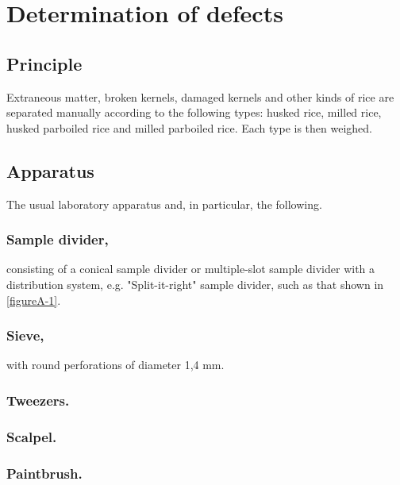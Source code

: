 \section{Determination of defects}
\label{AnnexA}

\subsection{Principle}

Extraneous matter, broken kernels, damaged kernels and other kinds of rice are separated manually according to the following types: husked rice, milled rice, husked parboiled rice and milled parboiled rice. Each type is then weighed.

\subsection{Apparatus}

The usual laboratory apparatus and, in particular, the following.

\subsubsection{Sample divider,}
\label{AnnexA-2-1}

consisting of a conical sample divider or multiple-slot sample divider with a distribution system, e.g. "Split-it-right" sample divider, such as that shown in \ref{figureA-1}.

\subsubsection{Sieve,}

with round perforations of diameter 1,4 mm.

\subsubsection{Tweezers.}

\subsubsection{Scalpel.}

\subsubsection{Paintbrush.}

